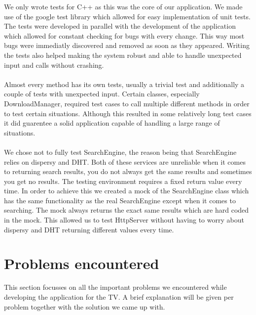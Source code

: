 We only wrote tests for C++ as this was the core of our application. We made use of the google test library which allowed for easy implementation of unit tests. The tests were developed in parallel with the development of the application which allowed for constant checking for bugs with every change. This way most bugs were immediatly discovered and removed as soon as they appeared. Writing the tests also helped making the system robust and able to handle unexpected input and calls without crashing.
\\\\
Almost every method has its own tests, usually a trivial test and additionally a couple of tests with unexpected input. Certain classes, especially DownloadManager, required test cases to call multiple different methods in order to test certain situations. Although this resulted in some relatively long test cases it did guarentee a solid application capable of handling a large range of situations.
\\\\
We chose not to fully test SearchEngine, the reason being that SearchEngine relies on dispersy and DHT. Both of these services are unreliable when it comes to returning search results, you do not always get the same results and sometimes you get no results. The testing environment requires a fixed return value every time. In order to achieve this we created a mock of the SearchEngine class which has the same functionality as the real SearchEngine except when it comes to searching. The mock always returns the exact same results which are hard coded in the mock. This allowed us to test HttpServer without having to worry about dispersy and DHT returning different values every time.

\section{Problems encountered}
This section focusses on all the important problems we encountered while developing the application for the TV.
A brief explanation will be given per problem together with the solution we came up with.

